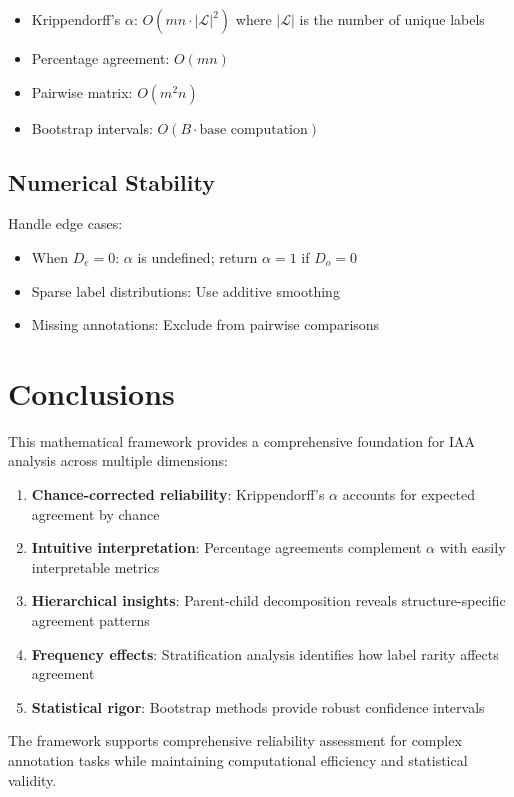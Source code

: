 \documentclass[11pt]{article}
\begin{document}
\begin{itemize}
\item Krippendorff's $\alpha$: $O(mn \cdot |\mathcal{L}|^2)$ where $|\mathcal{L}|$ is the number of unique labels
\item Percentage agreement: $O(mn)$
\item Pairwise matrix: $O(m^2 n)$
\item Bootstrap intervals: $O(B \cdot \text{base computation})$
\end{itemize}

\subsection{Numerical Stability}

Handle edge cases:
\begin{itemize}
\item When $D_e = 0$: $\alpha$ is undefined; return $\alpha = 1$ if $D_o = 0$
\item Sparse label distributions: Use additive smoothing
\item Missing annotations: Exclude from pairwise comparisons
\end{itemize}

\section{Conclusions}

This mathematical framework provides a comprehensive foundation for IAA analysis across multiple dimensions:

\begin{enumerate}
\item \textbf{Chance-corrected reliability}: Krippendorff's $\alpha$ accounts for expected agreement by chance
\item \textbf{Intuitive interpretation}: Percentage agreements complement $\alpha$ with easily interpretable metrics
\item \textbf{Hierarchical insights}: Parent-child decomposition reveals structure-specific agreement patterns
\item \textbf{Frequency effects}: Stratification analysis identifies how label rarity affects agreement
\item \textbf{Statistical rigor}: Bootstrap methods provide robust confidence intervals
\end{enumerate}

The framework supports comprehensive reliability assessment for complex annotation tasks while maintaining computational efficiency and statistical validity.
\end{document}
